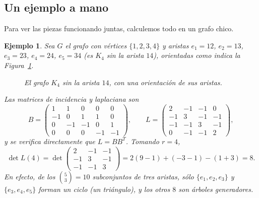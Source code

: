 \documentclass[12pt,a4paper]{article}
\theoremstyle{profesional}
\theoremstyle{definicion-style}
\newtheorem{ejemplo}[teorema]{Ejemplo}
\theoremstyle{observacion-style}
\begin{document}
\subsection{Un ejemplo a mano}

Para ver las piezas funcionando juntas, calculemos todo en un grafo chico.

\begin{ejemplo}\label{ej:diamante}
    Sea \( G \) el grafo con vértices \( \{1,2,3,4\} \) y aristas \( e_1 = 12 \), \( e_2 = 13 \), \( e_3 = 23 \), \( e_4 = 24 \), \( e_5 = 34 \) (es \( K_4 \) sin la arista \( 14 \)), orientadas como indica la Figura~\ref{fig:diamante}.

    \begin{figure}[ht]
        \centering
        \caption{El grafo \( K_4 \) sin la arista \( 14 \), con una orientación de sus aristas.}\label{fig:diamante}
    \end{figure}

    Las matrices de incidencia y laplaciana son
    \[
        B = \begin{pmatrix}
            1  & 1  & 0  & 0  & 0  \\
            -1 & 0  & 1  & 1  & 0  \\
            0  & -1 & -1 & 0  & 1  \\
            0  & 0  & 0  & -1 & -1
        \end{pmatrix},
        \qquad
        L = \begin{pmatrix}
            2  & -1 & -1 & 0  \\
            -1 & 3  & -1 & -1 \\
            -1 & -1 & 3  & -1 \\
            0  & -1 & -1 & 2
        \end{pmatrix},
    \]
    y se verifica directamente que \( L = B B^{T} \). Tomando \( r = 4 \),
    \[
        \det L(4) = \det \begin{pmatrix}
            2  & -1 & -1 \\
            -1 & 3  & -1 \\
            -1 & -1 & 3
        \end{pmatrix}
        = 2 (9 - 1) + (-3 - 1) - (1 + 3) = 8.
    \]
    En efecto, de los \( \binom{5}{3} = 10 \) subconjuntos de tres aristas, sólo \( \{e_1,e_2,e_3\} \) y \( \{e_3,e_4,e_5\} \) forman un ciclo (un triángulo), y los otros \( 8 \) son árboles generadores.


\end{ejemplo}
\end{document}
